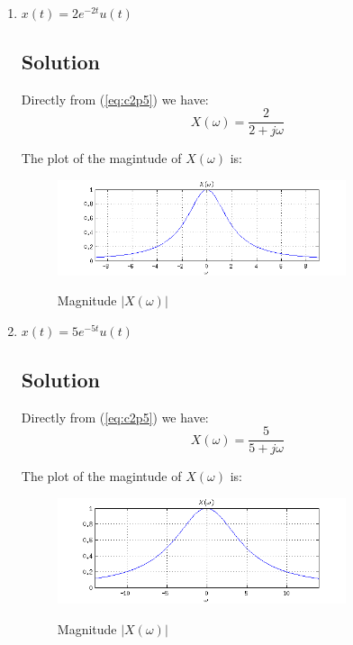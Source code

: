 \begin{enumerate}
\item $x(t) = 2 e^{-2 t} u(t)$
\subsection*{Solution}
Directly from (\ref{eq:c2p5}) we have:
\begin{equation*}
X(\omega) = \frac{2}{2 + j\omega}
\end{equation*} 

The plot of the magintude of $X(\omega)$ is:

\begin{figure}[H]
\caption{Magnitude $|X(\omega)|$}
\centering
\includegraphics[width=0.8\textwidth]{figs/c2p6b.png}
\label{fig:c2p6b}
\end{figure} 

\item $x(t) = 5 e^{-5 t} u(t)$
\subsection*{Solution}
Directly from (\ref{eq:c2p5}) we have:
\begin{equation*}
X(\omega) = \frac{5}{5 + j\omega}
\end{equation*} 

The plot of the magintude of $X(\omega)$ is:

\begin{figure}[H]
\caption{Magnitude $|X(\omega)|$}
\centering
\includegraphics[width=0.8\textwidth]{figs/c2p6c.png}
\label{fig:c2p6c}
\end{figure} 


\end{enumerate}
